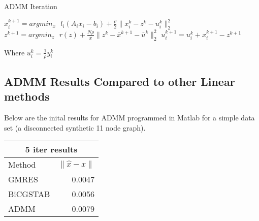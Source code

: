 \documentclass[a4paper,10pt]{article}
\begin{document}
\begin{center}
\begin{algorithm}
\caption{ADMM Iteration}
\begin{algorithmic}[1]
	\STATE $x_{i}^{k+1} = argmin_{x} \: \: \: l_{i}(A_{i}x_{i} - b_{i}) + \frac{\rho}{2} \| x_{i}^{k} - z^{k} - u_{i}^{k} \|_{2}^{2}$ 
	\STATE $z^{k+1} = argmin_{z} \: \: \: r(z) + \frac{N \rho}{x} \| z^{k} - \bar{x}^{k+1} - \bar{u}^{k} \|_{2}^{2} $
	\STATE $u_{i}^{k+1} = u_{i}^{k} + x_{i}^{k+1} - z^{k+1} $ 
  \end{algorithmic}
\end{algorithm}
\end{center}

Where $u_{i}^{k} = \frac{1}{\rho} y_{i}^{k}$



\subsection{ADMM Results Compared to other Linear methods}
Below are the inital results for ADMM programmed in Matlab for a simple data set (a disconnected synthetic 11 node graph). 

\begin{center}
\begin{tabular}{l || r}
	\hline\hline
	\multicolumn{2}{c}{5 iter results} \\
	\hline\hline
	Method  & $\|\hat{x} - x\| $ \\
	\hline
	GMRES & 0.0047  \\
	BiCGSTAB & 0.0056  \\
	ADMM & 0.0079  \\
\end{tabular}
\end{center}
\newpage
\end{document}
